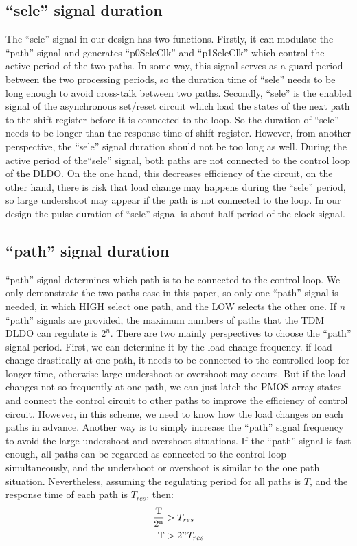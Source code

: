 \documentclass[journal]{IEEEtran}
\begin{document}
\subsection{``sele'' signal duration}
The ``sele'' signal in  our design has two functions. Firstly, it can modulate the ``path'' signal and generates ``p0SeleClk'' and ``p1SeleClk'' which control the active period of the two paths. In some way, this signal serves as a guard period between the two processing periods, so the duration time of ``sele'' needs to be long enough to avoid cross-talk between two paths. Secondly, ``sele'' is the enabled signal of the asynchronous set/reset circuit which load the states of the next path to the shift register before it is connected to the loop. So the duration of ``sele'' needs to be longer than the response time of shift register. However, from another perspective, the ``sele'' signal duration should not be too long as well. During the active period of the``sele'' signal, both paths are not connected to the control loop of the DLDO. On the one hand, this decreases efficiency of the circuit, on the other hand, there is risk that load change may happens during the ``sele'' period, so large undershoot may appear if the path is not connected to the loop. In our design the pulse duration of ``sele'' signal is about half period of the clock signal. 
\subsection{``path'' signal duration}
``path'' signal determines which path is to be connected to the control loop. We only demonstrate the two paths case in this paper, so only one ``path'' signal is needed, in which HIGH select one path, and the LOW selects the other one. If $n$ ``path'' signals are provided, the maximum numbers of paths that the TDM DLDO can regulate is $2^n$. There are two mainly perspectives to choose the ``path'' signal period. First, we can determine it by the load change frequency. if load change drastically at one path, it needs to be connected to the controlled loop for longer time, otherwise large undershoot or overshoot may occurs. But if the load changes not so frequently at one path, we can just latch the PMOS array states and connect the control circuit to other paths to improve the efficiency of control circuit. However, in this scheme, we need to know how the load changes on each paths in advance. Another way is to  simply increase the ``path'' signal frequency to avoid the large undershoot and overshoot situations. If the ``path'' signal is fast enough, all paths can be regarded as connected to the control loop simultaneously, and the undershoot or overshoot is similar to the one path situation. Nevertheless, assuming the regulating period for all paths is $T$, and the response time of each path is $T_{res}$, then:
\begin{align}
\rm \frac { T}{2^n} &> T_{res}\\
\rm T &> 2^nT_{res}
\end{align} 
\end{document}
